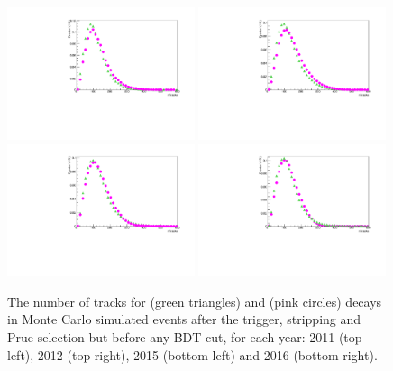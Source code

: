 \begin{figure}[ht]
  \centering
    \includegraphics[width=0.49\textwidth]{./Figs/LifetimeMeasurement/nTracks_2011_Bd2KPi_Bs2MuMu_Dec_triggers.pdf}
    \includegraphics[width=0.49\textwidth]{./Figs/LifetimeMeasurement/nTracks_2012_Bd2KPi_Bs2MuMu_Dec_triggers.pdf}
    \includegraphics[width=0.49\textwidth]{./Figs/LifetimeMeasurement/nTracks_2015_Bd2KPi_Bs2MuMu_Dec_triggers.pdf}
    \includegraphics[width=0.49\textwidth]{./Figs/LifetimeMeasurement/nTracks_2016_Bd2KPi_Bs2MuMu_Dec_triggers.pdf}
  \caption{The number of tracks for \bdkpi (green triangles) and \bsmumu (pink circles) decays in Monte Carlo simulated events after the trigger, stripping and Prue-selection but before any BDT cut, for each year: 2011 (top left), 2012 (top right), 2015 (bottom left) and 2016 (bottom right). }
  \label{fig:BsmmVsBdToKpinTracks}
\end{figure}


